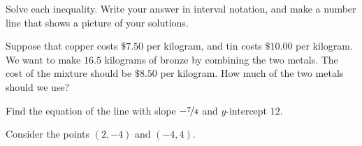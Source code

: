 \documentclass[addpoints, 12pt]{exam}
\begin{document}
\begin{questions}
\clearpage

\question[12]
Solve each inequality.  Write your answer in interval notation, and make a number line that shows a picture of your solutions.


\clearpage

\question[10]
Suppose that copper costs $\$7.50$ per kilogram, and tin costs $\$10.00$ per kilogram.  We want to make
$16.5$ kilograms of bronze by combining the two metals.  The cost of the mixture should be $\$8.50$ per kilogram.  How much of the two metals should we use?

\clearpage

\question[2]
Find the equation of the line with slope $- \nicefrac{7}{4}$ and $y$-intercept $12$.


\question[13]
Consider the points $(2,-4)$ and $(-4,4)$.

\end{questions}
\end{document}
